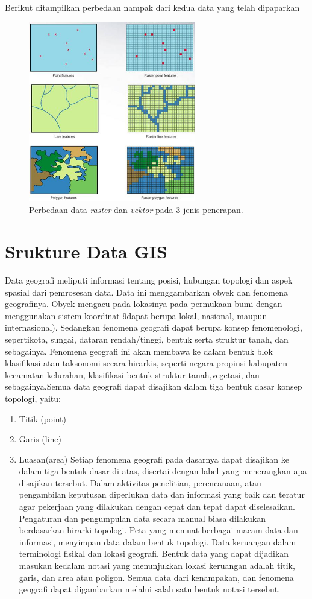 Berikut ditampilkan perbedaan nampak dari kedua data yang telah dipaparkan
		\begin{figure}[htbp]
		\centering
		\includegraphics[width=0.65\textwidth]{pictures/perbedaan.jpg}
		\caption{Perbedaan data \textit{raster} dan \textit{vektor} pada 3 jenis penerapan.}
		\label{labelgambar6}
		\end{figure}
\section{Srukture Data GIS}
Data geografi meliputi informasi tentang posisi, hubungan topologi dan aspek spasial dari pemrosesan data. Data ini menggambarkan obyek dan fenomena geografinya. Obyek mengacu pada lokasinya pada permukaan bumi dengan menggunakan sistem koordinat 9dapat berupa lokal, nasional, maupun internasional). Sedangkan fenomena geografi dapat berupa konsep fenomenologi, sepertikota, sungai, dataran rendah/tinggi, bentuk serta struktur tanah, dan sebagainya. Fenomena geografi ini akan membawa ke dalam bentuk blok klasifikasi atau taksonomi secara hirarkis, seperti negara-propinsi-kabupaten-kecamatan-kelurahan, klasifikasi bentuk struktur tanah,vegetasi, dan sebagainya.Semua data geografi dapat disajikan dalam tiga bentuk dasar konsep topologi, yaitu:
\begin{enumerate}
\item Titik (point)
\item Garis (line)
\item Luasan(area)
Setiap fenomena geografi pada dasarnya dapat disajikan ke dalam tiga bentuk dasar di atas, disertai dengan label yang menerangkan apa disajikan tersebut. Dalam aktivitas penelitian, perencanaan, atau pengambilan keputusan diperlukan data dan informasi yang baik dan teratur agar pekerjaan yang dilakukan dengan cepat dan tepat dapat diselesaikan. Pengaturan dan pengumpulan data secara manual biasa dilakukan berdasarkan hirarki topologi. Peta yang memuat berbagai macam data dan informasi, menyimpan data dalam bentuk topologi. Data keruangan dalam terminologi fisikal dan lokasi geografi. Bentuk data yang dapat dijadikan masukan kedalam notasi yang menunjukkan lokasi keruangan adalah titik, garis, dan area atau poligon. Semua data dari kenampakan, dan fenomena geografi dapat digambarkan melalui salah satu bentuk notasi tersebut.
\end{enumerate}

